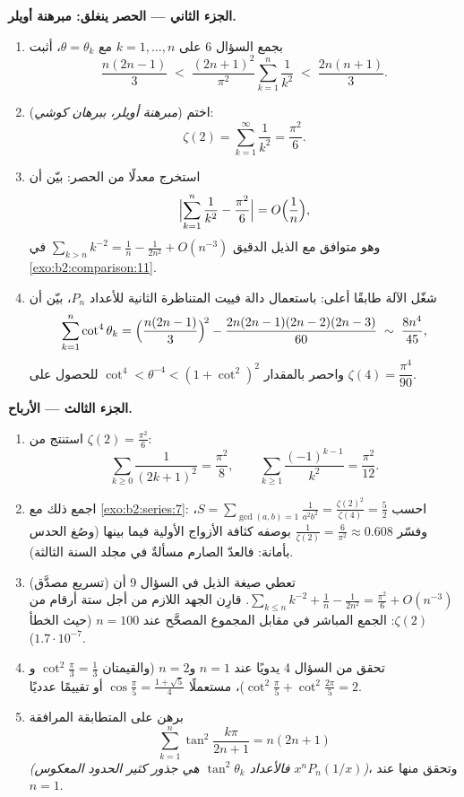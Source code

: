 \begin{problem}[{مسألة نهاية الأسبوع --- $\zeta(2) = \pi^2/6$ وبانوراما
برتران}]
\medskip
\noindent\textbf{الجزء الثاني --- الحصر ينغلق: مبرهنة
أويلر.}
\begin{enumerate}[resume]
  \item بجمع السؤال 6 على $k = 1, \dots, n$ مع $\theta =
        \theta_k$، أثبت
        \[
        \frac{n(2n-1)}{3} \;<\;
        \frac{(2n+1)^2}{\pi^2}\sum_{k=1}^{n}\frac1{k^2}
        \;<\; \frac{2n(n+1)}{3}.
        \]
  \item اختم (\emph{مبرهنة أويلر، ببرهان كوشي}):
        \[
        \zeta(2) = \sum_{k=1}^{\infty}\frac{1}{k^2} =
        \frac{\pi^2}{6}.
        \]
  \item استخرج معدلًا من الحصر: بيّن أن
        \[
        \Bigl|\sum_{k=1}^{n}\frac1{k^2} - \frac{\pi^2}6\Bigr|
        = O\Bigl(\frac1n\Bigr),
        \]
        وهو متوافق مع الذيل الدقيق $\sum_{k>n}k^{-2} =
        \frac1n - \frac{1}{2n^2} + O(n^{-3})$ في
        \cref{exo:b2:comparison:11}.
  \item شغّل الآلة طابقًا أعلى: باستعمال دالة فييت المتناظرة الثانية
        للأعداد $P_n$، بيّن أن
        \[
        \sum_{k=1}^{n}\cot^4\theta_k =
        \Bigl(\frac{n(2n-1)}3\Bigr)^{\!2} -
        \frac{2n(2n-1)(2n-2)(2n-3)}{60}
        \;\sim\; \frac{8n^4}{45},
        \]
        واحصر بالمقدار $\cot^4 < \theta^{-4} < (1 +
        \cot^2)^2$ للحصول على $\zeta(4) = \dfrac{\pi^4}{90}$.
\end{enumerate}

\medskip
\noindent\textbf{الجزء الثالث --- الأرباح.}
\begin{enumerate}[resume]
  \item استنتج من $\zeta(2) = \frac{\pi^2}6$:
        \[
        \sum_{k\geq0}\frac{1}{(2k+1)^2} = \frac{\pi^2}{8},
        \qquad
        \sum_{k\geq1}\frac{(-1)^{k-1}}{k^2} = \frac{\pi^2}{12}.
        \]
  \item اجمع ذلك مع \cref{exo:b2:series:7}: احسب $S =
        \sum_{\gcd(a,b)=1}\frac{1}{a^2b^2} =
        \frac{\zeta(2)^2}{\zeta(4)} = \frac52$، وفسّر
        $\frac{1}{\zeta(2)} = \frac{6}{\pi^2} \approx 0.608$ بوصفه
        كثافة الأزواج الأولية فيما بينها (وصُغ الحدس
        بأمانة: فالعدّ الصارم مسألةٌ في مجلد
        السنة الثالثة).
  \item (تسريع مصدَّق) تعطي صيغة الذيل في السؤال 9
        أن $\sum_{k\leq n}k^{-2} + \frac1n - \frac1{2n^2} =
        \frac{\pi^2}6 + O(n^{-3})$. قارِن الجهد اللازم من أجل
        ستة أرقام من $\zeta(2)$: الجمع المباشر في مقابل
        المجموع المصحَّح عند $n = 100$ (حيث الخطأ
        $1.7\cdot10^{-7}$).
  \item تحقق من السؤال 4 يدويًا عند $n = 1$ و$n = 2$ (والقيمتان
        $\cot^2\frac\pi3 = \frac13$ و
        $\cot^2\frac\pi5 + \cot^2\frac{2\pi}5 = 2$)، مستعملًا
        $\cos\frac\pi5 = \frac{1+\sqrt5}4$ أو تقييمًا عدديًا.
  \item برهن على المتطابقة المرافقة
        \[
        \sum_{k=1}^{n}\tan^2\frac{k\pi}{2n+1} = n(2n+1)
        \]
        \emph{(فالأعداد $\tan^2\theta_k$ هي جذور
        كثير الحدود المعكوس $x^nP_n(1/x)$)}، وتحقق منها عند $n
        = 1$.
\end{enumerate}


\end{problem}
